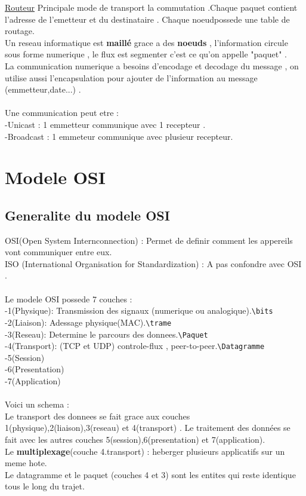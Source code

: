\documentclass[a4paper,12pt,openany]{book}
\begin{document}
\underline{Routeur}
Principale mode de transport la commutation .Chaque paquet contient l'adresse de l'emetteur et du destinataire . Chaque noeudpossede une table de routage.\\
Un reseau informatique est \textbf{maillé} grace a des \textbf{noeuds} , l'information circule sous forme numerique , le flux est segmenter c'est ce qu'on appelle "paquet" .\\
La communication numerique a besoins d'encodage et decodage du message , on utilise aussi l'encapsulation pour ajouter de l'information au message (emmetteur,date...) .\\
\\
Une communication peut etre :\\
-Unicast : 1 emmetteur communique avec 1 recepteur .\\
-Broadcast :  1 emmeteur communique avec plusieur recepteur.\\



\chapter{Modele OSI}
\section{Generalite du modele OSI}
OSI(Open System Internconnection) : Permet de definir comment les appereils vont communiquer entre eux.\\
ISO (International Organisation for Standardization) : A pas confondre avec OSI .\\
\\
Le modele OSI possede 7 couches :\\
-1(Physique): Transmission des signaux (numerique ou analogique).\verb+\bits+\\
-2(Liaison): Adessage physique(MAC).\verb+\trame+\\
-3(Reseau): Determine le parcours des donnees.\verb+\Paquet+\\
-4(Transport): (TCP et UDP) controle-flux , peer-to-peer.\verb+\Datagramme+\\
-5(Session)\\
-6(Presentation)\\
-7(Application)\\
\\
Voici un schema :\\
Le transport des donnees se fait grace aux couches 1(physique),2(liaison),3(reseau) et 4(transport) . Le traitement des données se fait avec les autres couches 5(session),6(presentation) et 7(application).\\
Le \textbf{multiplexage}(couche 4.transport) : heberger plusieurs applicatifs sur un meme hote.\\
Le datagramme et le paquet (couches 4 et 3) sont les entites qui reste identique tous le long du trajet.\\
\end{document}
